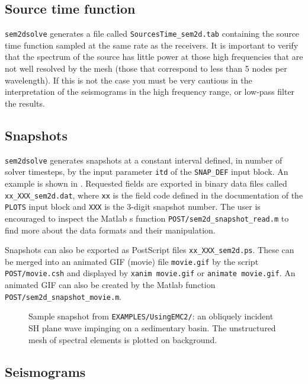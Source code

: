 \subsection{Source time function}

\texttt{sem2dsolve} generates a file called
\texttt{SourcesTime\_sem2d.tab} containing
the source time function sampled at the same rate as the receivers.
It is important to verify that the spectrum of the source
has little power at those high frequencies that are not well resolved by the mesh
(those that correspond to less than 5 nodes per wavelength).
If this is not the case you must be very cautious in the interpretation of 
the seismograms in the high frequency range, or low-pass filter the results.

\subsection{Snapshots}

\texttt{sem2dsolve} generates snapshots
at a constant interval defined, in number of solver timesteps, 
by the input parameter \texttt{itd} of the \texttt{SNAP\_DEF} input block.
An example is shown in .
Requested fields are exported in binary data files called \texttt{xx\_XXX\_sem2d.dat},
where \texttt{xx} is the field code defined in the documentation of the \texttt{PLOTS} input block
and \texttt{XXX} is the 3-digit snapshot number.
The user is encouraged to inspect the Matlab s
function \texttt{POST/sem2d\_snapshot\_read.m}
to find more about the data formats and their manipulation.

Snapshots can also be exported as PostScript files \texttt{xx\_XXX\_sem2d.ps}.
These can be merged into an animated GIF (movie) file \texttt{movie.gif} 
by the script \texttt{POST/movie.csh}
and displayed by \texttt{xanim movie.gif} or \texttt{animate movie.gif}.
An animated GIF can also be created by the 
Matlab function \texttt{POST/sem2d\_snapshot\_movie.m}.

\begin{figure} %
\caption{\label{Fig:snap} Sample snapshot from \texttt{EXAMPLES/UsingEMC2/}:
an obliquely incident SH plane wave impinging on a sedimentary basin. 
The unstructured mesh of spectral elements is plotted on background.}
\end{figure}

\subsection{Seismograms}

